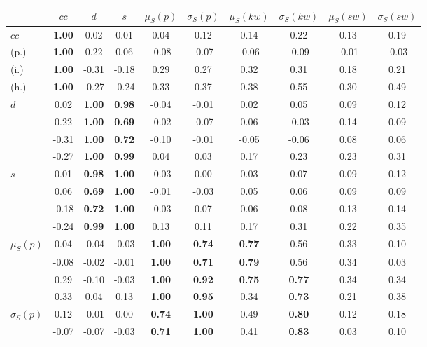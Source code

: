 \begin{table*}[h!]
\begin{center}
\begin{tabular}{| l || c | c | c | c | c | c | c | c | c |}\hline
 & $cc$ & $d$ & $s$ & $\mu_S(p)$ & $\sigma_S(p)$ & $\mu_S(kw)$ & $\sigma_S(kw)$ & $\mu_S(sw)$ & $\sigma_S(sw)$ \\\hline\hline
$cc$ & {\bf 1.00} & 0.02 & 0.01 & 0.04 & 0.12 & 0.14 & 0.22 & 0.13 & 0.19 \\
(p.) & {\bf 1.00} & 0.22 & 0.06 & -0.08 & -0.07 & -0.06 & -0.09 & -0.01 & -0.03 \\
(i.) & {\bf 1.00} & -0.31 & -0.18 & 0.29 & 0.27 & 0.32 & 0.31 & 0.18 & 0.21 \\
(h.) & {\bf 1.00} & -0.27 & -0.24 & 0.33 & 0.37 & 0.38 & 0.55 & 0.30 & 0.49 \\\hline
$d$ & 0.02 & {\bf 1.00} & {\bf 0.98} & -0.04 & -0.01 & 0.02 & 0.05 & 0.09 & 0.12 \\
 & 0.22 & {\bf 1.00} & {\bf 0.69} & -0.02 & -0.07 & 0.06 & -0.03 & 0.14 & 0.09 \\
 & -0.31 & {\bf 1.00} & {\bf 0.72} & -0.10 & -0.01 & -0.05 & -0.06 & 0.08 & 0.06 \\
 & -0.27 & {\bf 1.00} & {\bf 0.99} & 0.04 & 0.03 & 0.17 & 0.23 & 0.23 & 0.31 \\\hline
$s$ & 0.01 & {\bf 0.98} & {\bf 1.00} & -0.03 & 0.00 & 0.03 & 0.07 & 0.09 & 0.12 \\
 & 0.06 & {\bf 0.69} & {\bf 1.00} & -0.01 & -0.03 & 0.05 & 0.06 & 0.09 & 0.09 \\
 & -0.18 & {\bf 0.72} & {\bf 1.00} & -0.03 & 0.07 & 0.06 & 0.08 & 0.13 & 0.14 \\
 & -0.24 & {\bf 0.99} & {\bf 1.00} & 0.13 & 0.11 & 0.17 & 0.31 & 0.22 & 0.35 \\\hline
$\mu_S(p)$ & 0.04 & -0.04 & -0.03 & {\bf 1.00} & {\bf 0.74} & {\bf 0.77} & 0.56 & 0.33 & 0.10 \\
 & -0.08 & -0.02 & -0.01 & {\bf 1.00} & {\bf 0.71} & {\bf 0.79} & 0.56 & 0.34 & 0.03 \\
 & 0.29 & -0.10 & -0.03 & {\bf 1.00} & {\bf 0.92} & {\bf 0.75} & {\bf 0.77} & 0.34 & 0.34 \\
 & 0.33 & 0.04 & 0.13 & {\bf 1.00} & {\bf 0.95} & 0.34 & {\bf 0.73} & 0.21 & 0.38 \\\hline
$\sigma_S(p)$ & 0.12 & -0.01 & 0.00 & {\bf 0.74} & {\bf 1.00} & 0.49 & {\bf 0.80} & 0.12 & 0.18 \\
 & -0.07 & -0.07 & -0.03 & {\bf 0.71} & {\bf 1.00} & 0.41 & {\bf 0.83} & 0.03 & 0.10 \\

\end{tabular}
\end{center}
\end{table*}
